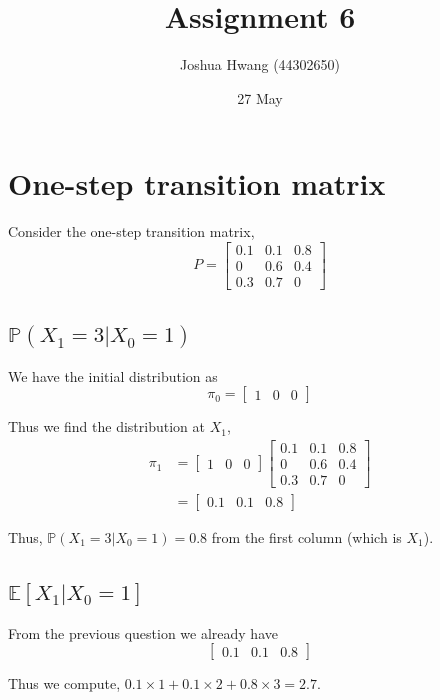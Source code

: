 \documentclass{article}
\title{Assignment 6}
\author{Joshua Hwang (44302650)}
\date{27 May}
\newcommand{\prob}{\mathbb{P}}
\newcommand{\expect}{\mathbb{E}}
\begin{document}
\maketitle

\section{One-step transition matrix}
Consider the one-step transition matrix,
\[
    P =
    \begin{bmatrix}
        0.1 & 0.1 & 0.8 \\
          0 & 0.6 & 0.4 \\
        0.3 & 0.7 &   0
    \end{bmatrix}
\]

\subsection{$\prob(X_1 = 3 | X_0 = 1)$}
We have the initial distribution as
\[
    \pi_0 =
    \begin{bmatrix}
        1 & 0 & 0
    \end{bmatrix}
\]

Thus we find the distribution at $X_1$,
\begin{align*}
    \pi_1
    &=
    \begin{bmatrix}
        1 & 0 & 0
    \end{bmatrix}
    \begin{bmatrix}
        0.1 & 0.1 & 0.8 \\
          0 & 0.6 & 0.4 \\
        0.3 & 0.7 &   0
    \end{bmatrix} \\
    &=
    \begin{bmatrix}
        0.1 & 0.1 & 0.8
    \end{bmatrix}
\end{align*}

Thus, $\prob(X_1 = 3 | X_0 = 1) = 0.8$ from the first column (which is $X_1$).

\subsection{$\expect[X_1 | X_0 = 1]$}
From the previous question we already have
\[
    \begin{bmatrix}
        0.1 & 0.1 & 0.8
    \end{bmatrix}
\]

Thus we compute, $0.1 \times 1 + 0.1 \times 2 + 0.8 \times 3 = 2.7$.
\end{document}
